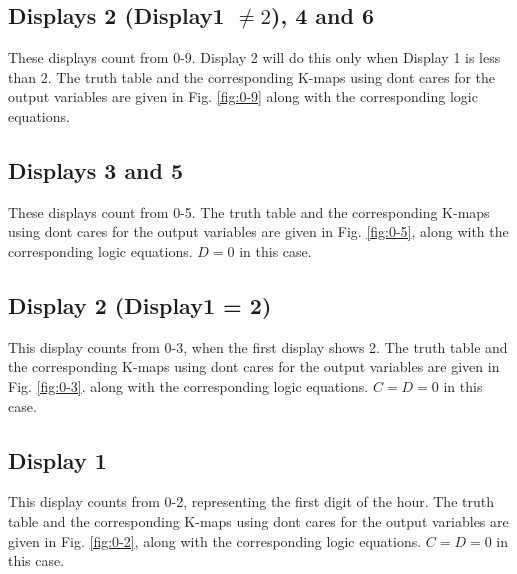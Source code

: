 

\subsection{Displays 2 (Display1 $\ne 2$), 4 and 6}
These displays count from 0-9.  Display 2 will do this only when Display 1 is less than 2.
The truth table 
and the corresponding K-maps using dont cares for the output variables are given in 
Fig. \ref{fig:0-9}
along with the corresponding logic equations.
\subsection{Displays 3 and 5}
These displays count from 0-5.  
The truth table 
and the corresponding K-maps using dont cares for the output variables are given in 
Fig. \ref{fig:0-5},
along with the corresponding logic equations.
    $D = 0$ in this case.

\subsection{Display 2 (Display1 = 2)}
This display counts from 0-3, when the first display shows 2.  
The truth table 
and the corresponding K-maps using dont cares for the output variables are given in 
Fig. \ref{fig:0-3}.
along with the corresponding logic equations.
    $C=D = 0$ in this case.
%

\subsection{Display 1}
This display counts from 0-2, representing the first digit of the hour. 
The truth table 
and the corresponding K-maps using dont cares for the output variables are given in 
Fig. \ref{fig:0-2},
along with the corresponding logic equations.
    $C=D = 0$ in this case.
%

